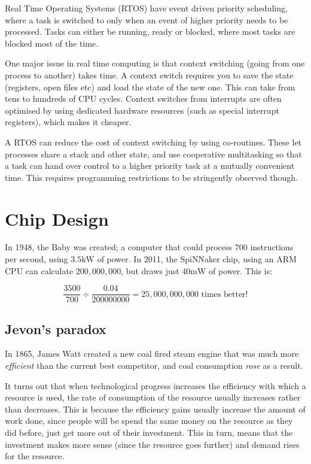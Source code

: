 Real Time Operating Systems (RTOS) have event driven priority scheduling, where
a task is switched to only when an event of higher priority needs to be
processed. Tasks can either be running, ready or blocked, where most tasks are
blocked most of the time.

One major issue in real time computing is that context switching (going from one
process to another) takes time. A context switch requires you to save the state
(registers, open files etc) and load the state of the new one. This can take
from tens to hundreds of CPU cycles. Context switches from interrupts are often
optimised by using dedicated hardware resources (such as special interrupt
registers), which makes it cheaper.

A RTOS can reduce the cost of context switching by using co-routines. These let
processes share a stack and other state, and use cooperative multitasking so
that a task can hand over control to a higher priority task at a mutually
convenient time. This requires programming restrictions to be stringently
observed though.

\section{Chip Design}

In 1948, the Baby was created; a computer that could process $700$ instructions
per second, using $3.5\si{\kilo\watt}$ of power. In 2011, the SpiNNaker chip,
using an ARM CPU can calculate $200,000,000$, but draws just
$40\si{\milli\watt}$ of power. This is:

\[
  \frac{3500}{700} \div \frac{0.04}{200000000} = 25,000,000,000 \text{~times better!}
\]

\subsection{Jevon's paradox}

In 1865, James Watt created a new coal fired steam engine that was much more
\textit{efficient} than the current best competitor, and coal consumption
\textit{rose} as a result.

It turns out that when technological progress increases the efficiency with
which a resource is used, the rate of consumption of the resource usually
increases rather than decreases. This is because the efficiency gains usually
increase the amount of work done, since people will be spend the same money on
the resource as they did before, just get more out of their investment. This in
turn, means that the investment makes more sense (since the resource goes
further) and demand rises for the resource.

